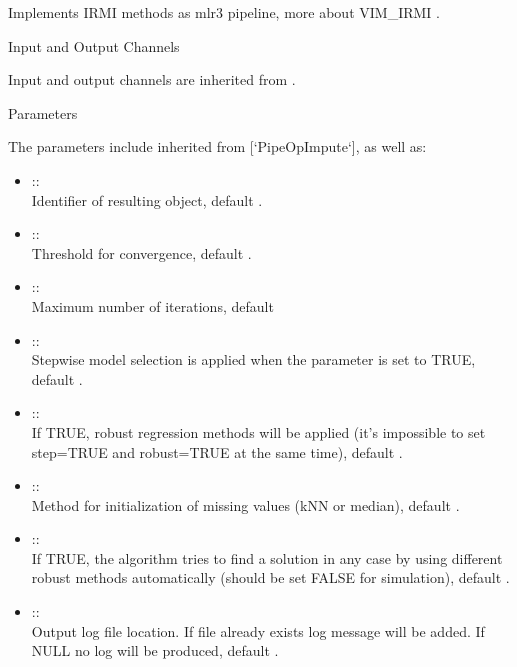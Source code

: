 \documentclass[letterpaper]{book}
\begin{document}
%
\begin{Description}\relax
Implements IRMI methods as mlr3 pipeline, more about VIM\_IRMI .
\end{Description}
%
\begin{Section}{Input and Output Channels}

Input and output channels are inherited from .
\end{Section}
%
\begin{Section}{Parameters}

The parameters include inherited from [`PipeOpImpute`], as well as: \\{}
\begin{itemize}

\item{}  :: \\{}
Identifier of resulting object, default .
\item{}  :: \\{}
Threshold for convergence, default .
\item{}  :: \\{}
Maximum number of iterations, default 
\item{}  :: \\{}
Stepwise model selection is applied when the parameter is set to TRUE, default .
\item{}  :: \\{}
If TRUE, robust regression methods will be applied (it's impossible to set step=TRUE and robust=TRUE at the same time), default .
\item{}  :: \\{}
Method for initialization of missing values (kNN or median), default .
\item{}  :: \\{}
If TRUE, the algorithm tries to find a solution in any case by using different robust methods automatically (should be set FALSE for simulation), default .
\item{}  :: \\{}
Output log file location. If file already exists log message will be added. If NULL no log will be produced, default .

\end{itemize}

\end{Section}
\end{document}

